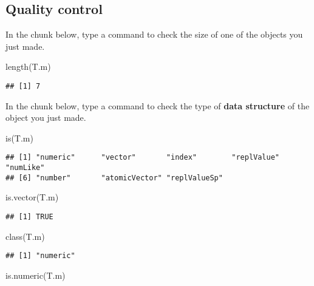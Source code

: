 \documentclass[
]{book}
\newenvironment{Shaded}{\begin{snugshade}}{\end{snugshade}}
\newcommand{\FunctionTok}[1]{\textcolor[rgb]{0.00,0.00,0.00}{#1}}
\newcommand{\NormalTok}[1]{#1}
\begin{document}
\hypertarget{quality-control}{%
\subsection{Quality control}\label{quality-control}}

In the chunk below, type a command to check the size of one of the objects you just made.

\begin{Shaded}
\begin{Highlighting}[]
\FunctionTok{length}\NormalTok{(T.m)}
\end{Highlighting}
\end{Shaded}

\begin{verbatim}
## [1] 7
\end{verbatim}

In the chunk below, type a command to check the type of \textbf{data structure} of the object you just made.

\begin{Shaded}
\begin{Highlighting}[]
\FunctionTok{is}\NormalTok{(T.m)}
\end{Highlighting}
\end{Shaded}

\begin{verbatim}
## [1] "numeric"      "vector"       "index"        "replValue"    "numLike"     
## [6] "number"       "atomicVector" "replValueSp"
\end{verbatim}

\begin{Shaded}
\begin{Highlighting}[]
\FunctionTok{is.vector}\NormalTok{(T.m)}
\end{Highlighting}
\end{Shaded}

\begin{verbatim}
## [1] TRUE
\end{verbatim}

\begin{Shaded}
\begin{Highlighting}[]
\FunctionTok{class}\NormalTok{(T.m)}
\end{Highlighting}
\end{Shaded}

\begin{verbatim}
## [1] "numeric"
\end{verbatim}

\begin{Shaded}
\begin{Highlighting}[]
\FunctionTok{is.numeric}\NormalTok{(T.m)}
\end{Highlighting}
\end{Shaded}
\end{document}
